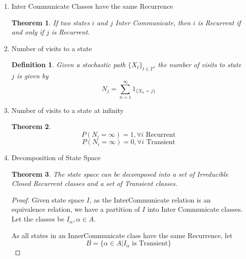 \documentclass{article}
\newtheorem{definition}{Definition}[section]
\newtheorem{theorem}{Theorem}[section]
\begin{document}
\begin{enumerate}
\begin{proof}
          This is a contradiction. Thus, there is at least one Recurrent State.
        \end{proof}
  \item Inter Communicate Classes have the same Recurrence
        \begin{theorem}
          If two states $i$ and $j$ Inter Communicate, then
          $i$ is Recurrent if and only if $j$ is Recurrent.
        \end{theorem}
  \item Number of visits to a state
        \begin{definition}
          Given a stochastic path $\{X_t\}_{t \in T}$,
          the number of visits to state $j$ is given by
          \begin{equation}
            N_{j} = \sum_{n=1}^{\infty} 1_{\{X_{n} = j\}}
          \end{equation}
        \end{definition}
  \item Number of visits to a state at infinity
        \begin{theorem}
          \begin{equation}
            P(N_{i} = \infty) = 1, \forall i \text{ Recurrent}
          \end{equation}
          \begin{equation}
            P(N_{i} = \infty) = 0, \forall i \text{ Transient}
          \end{equation}
        \end{theorem}
  \item Decomposition of State Space
        \begin{theorem}
          The state space can be decomposed into a set of Irreducible Closed Recurrent classes
          and a set of Transient classes.
        \end{theorem}
        \begin{proof}
          Given state space $I$,
          as the InterCommunicate relation is an equivalence relation,
          we have a partition of $I$ into Inter Communicate classes.
          Let the classes be $I_{\alpha}, \alpha \in A$.

          As all states in an InnerCommunicate class have the same Recurrence,
          let
          \begin{equation}
            B = \{\alpha \in A | I_{\alpha} \text{ is Transient}\}
          \end{equation}


\end{proof}
\end{enumerate}
\end{document}
